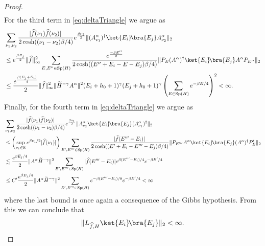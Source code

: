 \documentclass[11pt]{amsart}
\newcommand{\1}{\mathbbm{1}}
\newcommand{\R}{\mathbb{R}}
\newcommand{\spec}{\operatorname{Sp}}
\theoremstyle{plain}
\theoremstyle{definition}
\theoremstyle{remark}
\numberwithin{equation}{section}
\begin{document}
\begin{proof}
\begin{align*}
\end{align*}
 For the third term in \eqref{eq:deltaTriangle} we argue as
\begin{align*}
    &\sum_{\nu_1,\nu_2} \frac{|\widehat{f}(\nu_1)\widehat{f}(\nu_2)|\,}{2\cosh((\nu_1-\nu_2)\beta/4)}
e^{\frac{\beta\nu_2}{2}}\|(A^\alpha_{\nu_1})^\dagger \ket{E_i}\!\bra{E_j}A^\alpha_{\nu_2}\|_2\\&\le e^{\frac{\beta E_j}{2}} \|\widehat f\|^2_\infty \sum_{E,E''\in\spec(H)} \frac{e^{\frac{-\beta E''}{2}}}{2\cosh((E''+E_i-E-E_j)\beta/4)}
 \|P_E(A^\alpha)^\dagger \ket{E_i}\!\bra{E_j}A^\alpha P_{E''}\|_2 \\&\le \frac{e^{\frac{\beta (E_j+E_i)}{4}}}{2} \|\widehat f\|^2_\infty\|\widetilde H^{-\gamma}A^\alpha\|^2(E_i+h_0+1)^{\gamma}(E_j+h_0+1)^{\gamma}  \left(\sum_{E\in\spec(H)} e^{-\beta E/4}\right)^2<\infty.
\end{align*}
Finally, for the fourth term in \eqref{eq:deltaTriangle} we argue as
\begin{align*}
    &\sum_{\nu_1,\nu_2} \frac{|\widehat{f}(\nu_1)\widehat{f}(\nu_2)|\,}{2\cosh((\nu_1-\nu_2)\beta/4)}
e^{\frac{\beta\nu_1}{2}}\|A^\alpha_{\nu_2} \ket{E_i}\!\bra{E_j}(A^\alpha_{\nu_1})^\dagger\|_2\\&\le  \left(\sup_{\nu_1\in\R}e^{\beta\nu_1/2}|\widehat f(\nu_1)|\right)\sum_{E',E'''\in\spec(H)} \frac{|\widehat{f}(E'''-E_i)|\,}{2\cosh((E'+E_i-E'''-E_j)\beta/4)}
\|P_{E'''}A^\alpha \ket{E_i}\!\bra{E_j}(A^\alpha)^\dagger P_E'\|_2 \\&\lesssim \frac{e^{\beta E_j/4}}{2}\|A^\alpha \widetilde H^{-\gamma}\|^2\sum_{E',E'''\in\spec(H)} |\widehat f(E'''-E_i)| e^{\beta (E'''-E_i)/4} e^{-\beta E'/4}\\
&\le C'\frac{e^{\beta E_j/4}}{2}\|A^\alpha \widetilde H^{-\gamma}\|^2\sum_{E',E'''\in\spec(H)}  e^{-\beta (E'''-E_i)/8} e^{-\beta E'/4}<\infty
\end{align*}
where the last bound is once again a consequence of the Gibbs hypothesis. From this we can conclude that
\begin{align*}
    \|L_{\widehat f,H}\ket{E_i}\!\bra{E_j}\|_2<\infty.
\end{align*}

\end{proof}
\end{document}
